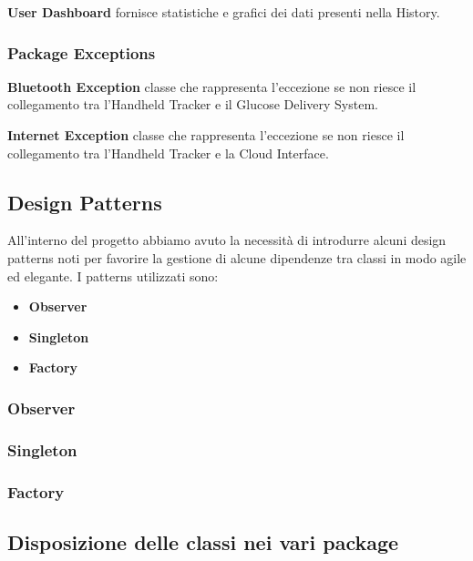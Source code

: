 \documentclass[twocolumn]{article}
\begin{document}
\noindent\textbf{User Dashboard}
\newline fornisce statistiche e grafici dei dati presenti nella History.


\subsubsection{Package Exceptions}

\noindent\textbf{Bluetooth Exception}
\newline classe che rappresenta l'eccezione se non riesce il collegamento tra l'Handheld Tracker e il Glucose Delivery System.

\noindent\textbf{Internet Exception}
\newline  classe che rappresenta l'eccezione se non riesce il collegamento tra l'Handheld Tracker e la Cloud Interface.


\subsection{Design Patterns}
All’interno del progetto abbiamo avuto la necessità di introdurre alcuni design patterns noti per favorire la gestione di alcune dipendenze tra classi in modo agile ed elegante. I patterns utilizzati sono:
\begin{itemize}
    \setlength\itemsep{0em}
    \item \textbf{Observer}
    \item \textbf{Singleton}
    \item \textbf{Factory}
\end{itemize}

\subsubsection{Observer}



\newpage
\subsubsection{Singleton}


\subsubsection{Factory}


\subsection{Disposizione delle classi nei vari package}
\end{document}
